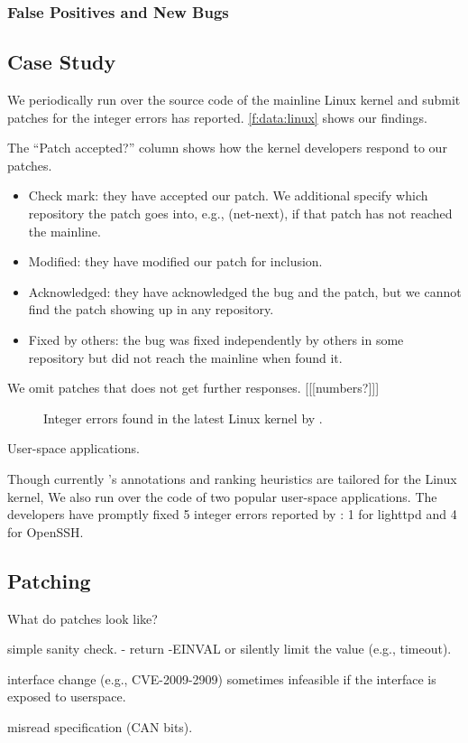 \subsubsection{False Positives and New Bugs}


\subsection{Case Study}

We periodically run \sys over the source code of the mainline Linux
kernel and submit patches for the integer errors \sys has reported.
\autoref{f:data:linux} shows our findings.

The ``Patch accepted?'' column shows how the kernel developers
respond to our patches.
\begin{itemize}
\item
Check mark: they have accepted our patch.  We
additional specify which repository the patch goes into, e.g.,
(net-next), if that patch has not reached the mainline.
\item
Modified: they have modified our patch for inclusion.
\item
Acknowledged: they have acknowledged the bug and the patch, but we
cannot find the patch showing up in any repository.
\item
Fixed by others: the bug was fixed independently by others in some
repository but did not reach the mainline when \sys found it.
\end{itemize}
We omit patches that does not get further responses. [[[numbers?]]]

\begin{figure*}
\centering
\footnotesize

\caption{Integer errors found in the latest Linux kernel by \sys.}
\label{f:data:linux}
\end{figure*}

User-space applications.

Though currently \sys's annotations and ranking heuristics are
tailored for the Linux kernel, We also run \sys over the code of
two popular user-space applications.  The developers have promptly
fixed 5 integer errors reported by \sys: 1 for lighttpd and 4 for
OpenSSH.

\subsection{Patching}

What do patches look like?

simple sanity check.
- return -EINVAL or silently limit the value (e.g., timeout).

interface change (e.g., CVE-2009-2909)
sometimes infeasible if the interface is exposed to userspace.

misread specification (CAN bits).
